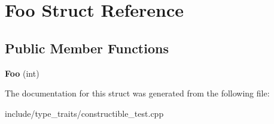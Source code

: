 \hypertarget{structFoo}{}\section{Foo Struct Reference}
\label{structFoo}
\subsection*{Public Member Functions}
\begin{DoxyCompactItemize}
\item 
\mbox{\label{structFoo_abb3c5d207b2219e5a57b4c49a0e48417}} 
{\bfseries Foo} (int)
\end{DoxyCompactItemize}


The documentation for this struct was generated from the following file\+:\begin{DoxyCompactItemize}
\item 
include/type\+\_\+traits/constructible\+\_\+test.\+cpp\end{DoxyCompactItemize}
